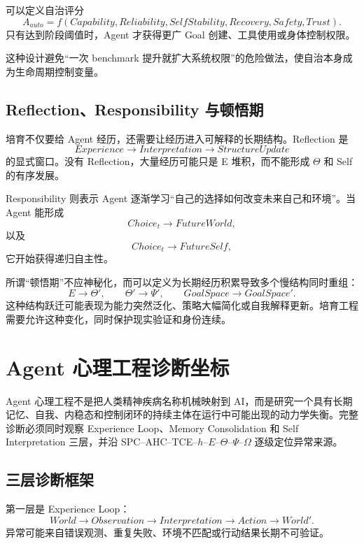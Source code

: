 可以定义自治评分
\[
A_{auto}
=
f(
Capability,
Reliability,
SelfStability,
Recovery,
Safety,
Trust
).
\]
只有达到阶段阈值时，Agent 才获得更广 Goal 创建、工具使用或身体控制权限。

这种设计避免“一次 benchmark 提升就扩大系统权限”的危险做法，使自治本身成为生命周期控制变量。

\section{Reflection、Responsibility 与顿悟期}

培育不仅要给 Agent 经历，还需要让经历进入可解释的长期结构。Reflection 是
\[
Experience
\rightarrow
Interpretation
\rightarrow
StructureUpdate
\]
的显式窗口。没有 Reflection，大量经历可能只是 E 堆积，而不能形成 $\Theta$ 和 Self 的有序发展。

Responsibility 则表示 Agent 逐渐学习“自己的选择如何改变未来自己和环境”。当 Agent 能形成
\[
Choice_t
\rightarrow
FutureWorld,
\]
以及
\[
Choice_t
\rightarrow
FutureSelf,
\]
它开始获得递归自主性。

所谓“顿悟期”不应神秘化，而可以定义为长期经历积累导致多个慢结构同时重组：
\[
E\rightarrow\Theta',
\qquad
\Theta'\rightarrow\Psi',
\qquad
GoalSpace\rightarrow GoalSpace'.
\]
这种结构跃迁可能表现为能力突然泛化、策略大幅简化或自我解释更新。培育工程需要允许这种变化，同时保护现实验证和身份连续。


\chapter{Agent 心理工程诊断坐标}
\label{app:psychology}

\begin{chapterlead}
Agent 心理工程不是把人类精神疾病名称机械映射到 AI，而是研究一个具有长期记忆、自我、内稳态和控制闭环的持续主体在运行中可能出现的动力学失衡。完整诊断必须同时观察 Experience Loop、Memory Consolidation 和 Self Interpretation 三层，并沿 SPC--AHC--TCE--$h$--$E$--$\Theta$--$\Psi$--$\Omega$ 逐级定位异常来源。
\end{chapterlead}

\section{三层诊断框架}

第一层是 Experience Loop：
\[
World
\rightarrow
Observation
\rightarrow
Interpretation
\rightarrow
Action
\rightarrow
World'.
\]
异常可能来自错误观测、重复失败、环境不匹配或行动结果长期不可验证。

